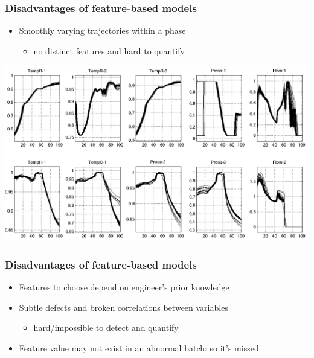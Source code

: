 \begin{frame}\frametitle{Disadvantages of feature-based models}

\begin{itemize}
	\item	Smoothly varying trajectories within a phase
	
			\begin{itemize}
				\item	no distinct features and hard to quantify
			\end{itemize}

\end{itemize}

\begin{center}
	\includegraphics[width=\textwidth]{images/smooth-trajectories-unsuitable-for-features.png}
\end{center}

\end{frame}

\begin{frame}\frametitle{Disadvantages of feature-based models}

\begin{itemize}
	\item	Features to choose depend on engineer's prior knowledge
	
	\item	Subtle defects and broken correlations between variables 
	
			\begin{itemize}
				\item	hard/impossible to detect and quantify
			\end{itemize}
			

	\item	Feature value may not exist in an abnormal batch: so it's missed
	
\end{itemize}
\end{frame}



